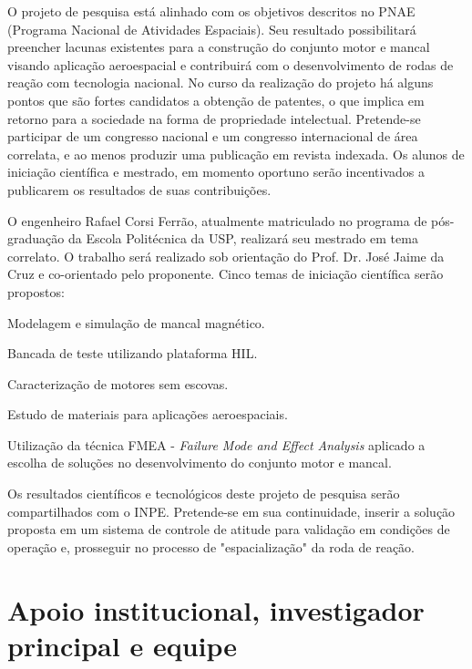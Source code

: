 O projeto de pesquisa está alinhado com os objetivos descritos no PNAE (Programa Nacional de Atividades Espaciais). Seu resultado possibilitará preencher lacunas existentes para a construção do conjunto motor e mancal visando aplicação aeroespacial e contribuirá com o desenvolvimento de rodas de reação com tecnologia nacional. No curso da realização do projeto há alguns pontos que são fortes candidatos a obtenção de patentes, o que implica em retorno para a sociedade na forma de propriedade intelectual. Pretende-se participar de um congresso nacional e um congresso internacional de área correlata, e ao menos produzir uma publicação em revista indexada. Os alunos de iniciação científica e mestrado, em momento oportuno serão incentivados a publicarem os resultados de suas contribuições.
 
 O engenheiro Rafael Corsi Ferrão, atualmente matriculado no programa de pós-graduação da Escola Politécnica da USP, realizará seu mestrado em tema correlato. O trabalho será realizado sob orientação do Prof. Dr. José Jaime da Cruz e co-orientado pelo proponente. Cinco temas de iniciação científica serão propostos:

\begin{compactitem}
		\item Modelagem  e simulação de mancal magnético.
		\item Bancada de teste utilizando plataforma HIL.
		\item Caracterização de motores sem escovas.
		\item Estudo de materiais para aplicações aeroespaciais.
		\item Utilização da técnica FMEA - \textit{Failure Mode and Effect Analysis} 	aplicado a escolha de soluções no desenvolvimento do conjunto motor e mancal.
\end{compactitem}


Os resultados científicos e tecnológicos deste projeto de pesquisa serão compartilhados com o INPE. Pretende-se em sua continuidade, inserir a solução proposta em um sistema de controle de atitude para validação em condições de operação e, prosseguir no processo de "espacialização"  da roda de reação.

\section{Apoio institucional, investigador principal e equipe} 

